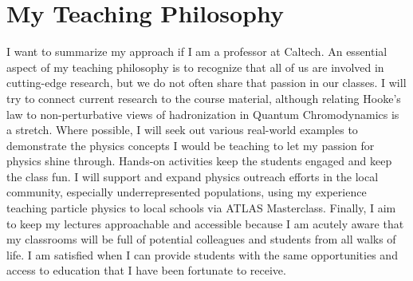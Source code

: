 \documentclass[10pt,a4paper,sans]{moderncv} %
\begin{document}
\section{My Teaching Philosophy}
I want to summarize my approach if I am a professor at Caltech. An essential aspect of my teaching philosophy is to recognize that all of us are involved in cutting-edge research, but we do not often share that passion in our classes. I will try to connect current research to the course material, although relating Hooke's law to non-perturbative views of hadronization in Quantum Chromodynamics is a stretch. Where possible, I will seek out various real-world examples to demonstrate the physics concepts I would be teaching to let my passion for physics shine through. Hands-on activities keep the students engaged and keep the class fun. I will support and expand physics outreach efforts in the local community, especially underrepresented populations, using my experience teaching particle physics to local schools via ATLAS Masterclass. Finally, I aim to keep my lectures approachable and accessible because I am acutely aware that my classrooms will be full of potential colleagues and students from all walks of life. I am satisfied when I can provide students with the same opportunities and access to education that I have been fortunate to receive.

\printbibliography
\end{document}
